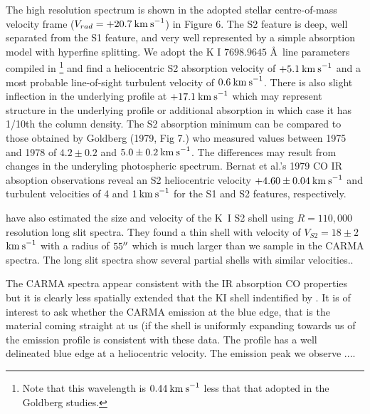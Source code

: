 \documentclass[preprint2]{aastex}
\begin{document}
The high resolution spectrum is shown in the adopted stellar centre-of-mass velocity frame ($V_{rad}=+20.7\>{\rm km\>s}^{-1}$) in Figure 6. The S2 feature is deep, well separated from the S1 feature, and very well represented by a simple absorption model with hyperfine splitting. We adopt the K I $7698.9645$ \AA \ line parameters compiled in \cite{2003ApJS..149..205M}\footnote{Note that this wavelength is $0.44\>{\rm km\>s}^{-1}$ less that that adopted in the Goldberg studies.} and find a heliocentric S2 absorption velocity of $+5.1\>{\rm km\>s}^{-1}$  and a most probable line-of-sight turbulent velocity of $0.6\>{\rm km\>s}^{-1}$. There is also slight inflection in the underlying profile at $+17.1\>{\rm km\>s}^{-1}$ which may represent structure in the underlying profile or additional absorption in which case it has 1/10th the column density.  The S2 absorption minimum can be compared to those obtained by Goldberg (1979, Fig 7.) who measured values between 1975 and 1978 of  $4.2\pm 0.2$ and $5.0\pm 0.2 \>{\rm km\>s}^{-1}$. The differences may result from changes in the underyling photospheric spectrum. Bernat et al.'s 1979 CO IR absoption observations reveal an S2 heliocentric velocity $+4.60\pm 0.04 \>{\rm km\>s}^{-1}$ and turbulent velocities of 4 and $1\>{\rm km\>s}^{-1}$ for the S1 and S2 features, respectively.

\cite{2002A&A...386.1009P} have also estimated the size and velocity of the K~I S2 shell using $R=110,000$ resolution long slit spectra. They found a thin shell with velocity of $V_{S2}=18\pm 2$ ${\rm km\>s}^{-1}$  with a radius of $55\mbox{$^{\prime\prime}$}$ which is much larger than we sample in the CARMA spectra. The long slit spectra show several partial shells with similar velocities..

The CARMA spectra appear consistent with the IR absorption CO properties but it is clearly less spatially extended that the KI shell indentified by \cite{2002A&A...386.1009P}. It is of interest to ask whether the CARMA emission at the blue edge, that is the material coming straight at us (if the shell is uniformly expanding towards us of the emission profile is consistent with these data. The profile has a well delineated blue edge at a heliocentric velocity. The emission peak we observe ....
\end{document}
